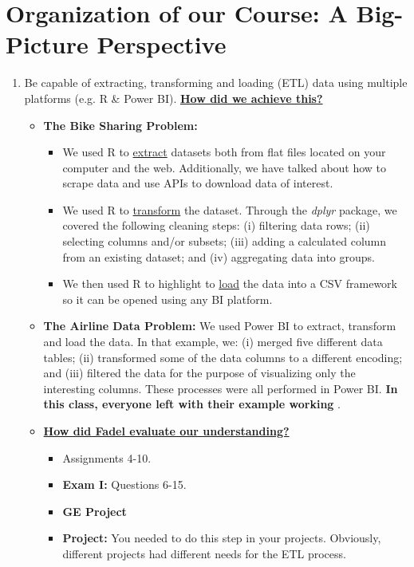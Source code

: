 \documentclass[letterpaper,12pt]{article}
\title{}
\author{}
\date{}
\begin{document}
\section*{Organization of our Course: A Big-Picture Perspective}
\begin{enumerate}[label=(\Alph*)]
	\item Be capable of extracting, transforming and loading (ETL) data using multiple platforms (e.g. R \& Power BI). \underline{\textbf{\textbf{How did we achieve this?}}}
	\begin{itemize}[nosep]
		\item \textbf{The Bike Sharing Problem:} 
		\begin{itemize}[nosep]
			\item We used R to \ul{extract} datasets both from flat files located on your computer and the web. Additionally, we have talked about how to scrape data and use APIs to download data of interest.
			\item We used R to \ul{transform} the dataset. Through the \textit{dplyr} package, we covered the following cleaning steps: (i) filtering data rows; (ii) selecting columns and/or subsets; (iii) adding a calculated column from an existing dataset; and (iv) aggregating data into groups.
			\item We then used R to highlight to \ul{load} the data into a CSV framework so it can be opened using any BI platform.
		\end{itemize}
		\item \textbf{The Airline Data Problem:} We used Power BI to extract, transform and load the data. In that example, we: (i) merged five different data tables; (ii) transformed some of the data columns to a different encoding; and (iii) filtered the data for the purpose of visualizing only the interesting columns. These processes were all performed in Power BI. \textbf{In this class, everyone left with their example working \smiley{}}.
		\item \textbf{\ul{How did Fadel evaluate our understanding?}}
		\begin{itemize}[nosep]
			\item Assignments 4-10.
			\item \textbf{Exam I:} Questions 6-15.
			\item \textbf{GE Project}
			\item \textbf{Project:} You needed to do this step in your projects. Obviously, different projects had different needs for the ETL process.
		\end{itemize}

\end{itemize}
\end{enumerate}
\end{document}

